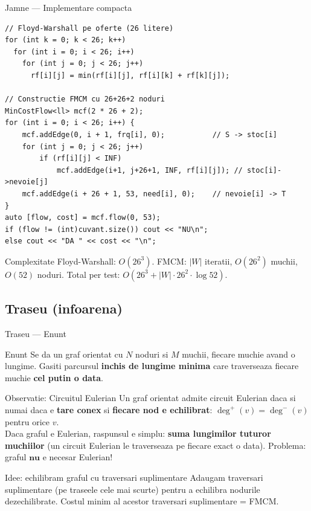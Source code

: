 ﻿\documentclass[9pt]{beamer}
\begin{document}
\begin{frame}{Jamne --- Implementare compacta}
  \begin{lstlisting}
// Floyd-Warshall pe oferte (26 litere)
for (int k = 0; k < 26; k++)
  for (int i = 0; i < 26; i++)
    for (int j = 0; j < 26; j++)
      rf[i][j] = min(rf[i][j], rf[i][k] + rf[k][j]);

// Constructie FMCM cu 26+26+2 noduri
MinCostFlow<ll> mcf(2 * 26 + 2);
for (int i = 0; i < 26; i++) {
    mcf.addEdge(0, i + 1, frq[i], 0);           // S -> stoc[i]
    for (int j = 0; j < 26; j++)
        if (rf[i][j] < INF)
            mcf.addEdge(i+1, j+26+1, INF, rf[i][j]); // stoc[i]->nevoie[j]
    mcf.addEdge(i + 26 + 1, 53, need[i], 0);    // nevoie[i] -> T
}
auto [flow, cost] = mcf.flow(0, 53);
if (flow != (int)cuvant.size()) cout << "NU\n";
else cout << "DA " << cost << "\n";
  \end{lstlisting}
  \begin{block}{Complexitate}
    \footnotesize
    Floyd-Warshall: $O(26^3)$. FMCM: $|W|$ iteratii, $O(26^2)$ muchii, $O(52)$ noduri.
    Total per test: $O(26^3 + |W|\cdot 26^2\cdot\log 52)$.
  \end{block}
\end{frame}

\subsection*{Traseu (infoarena)}

\begin{frame}[shrink]{Traseu --- Enunt}
  \begin{block}{Enunt}
    Se da un graf orientat cu $N$ noduri si $M$ muchii, fiecare muchie avand o lungime.
    Gasiti parcursul \textbf{inchis de lungime minima} care traverseaza fiecare muchie
    \textbf{cel putin o data}.
  \end{block}
  \begin{exampleblock}{Observatie: Circuitul Eulerian}
    Un graf orientat admite circuit Eulerian daca si numai daca e \textbf{tare conex}
    si \textbf{fiecare nod e echilibrat}: $\deg^+(v) = \deg^-(v)$ pentru orice $v$.\\[4pt]
    Daca graful e Eulerian, raspunsul e simplu: \textbf{suma lungimilor tuturor muchiilor}
    (un circuit Eulerian le traverseaza pe fiecare exact o data).
    Problema: graful $\mathbf{nu}$ e necesar Eulerian!
  \end{exampleblock}
  \begin{alertblock}{Idee: echilibram graful cu traversari suplimentare}
    \footnotesize
    Adaugam traversari suplimentare (pe traseele cele mai scurte) pentru a echilibra
    nodurile dezechilibrate. Costul minim al acestor traversari suplimentare = FMCM.
  \end{alertblock}
\end{frame}
\end{document}
